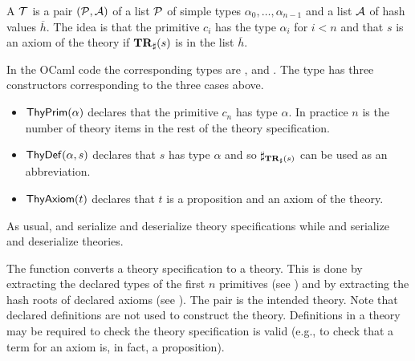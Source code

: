 A {} $\mathcal{T}$ is a pair $(\mathcal{P},\mathcal{A})$
of a list $\mathcal{P}$ of simple types $\alpha_0,\ldots,\alpha_{n-1}$
and a list $\mathcal{A}$ of hash values $\overline{h}$.
The idea is that the primitive $c_i$ has the type $\alpha_i$ for $i<n$
and that $s$ is an axiom of the theory if $\mathbf{TR}_{\sharp}(s)$ is in the list $\overline{h}$.

In the OCaml code the corresponding types are
{}, {} and
{}.
The type {} has three constructors corresponding to the three cases above.
\begin{itemize}
\item $\mbox{\constr{ThyPrim}}(\alpha)$ declares that the primitive $c_n$ has type $\alpha$.
In practice $n$ is the number of {} theory items in the rest of the
theory specification.
\item $\mbox{\constr{ThyDef}}(\alpha,s)$ declares that $s$ has type $\alpha$ and so $\mathbf{\sharp}_{\mathbf{TR}_{\sharp}(s)}$ can
be used as an abbreviation.
\item $\mbox{\constr{ThyAxiom}}(t)$ declares that $t$ is a proposition and an axiom of the theory.
\end{itemize}
As usual, 
{} and {} serialize and deserialize theory specifications
while
{} and {} serialize and deserialize theories.


The function {} converts a theory specification to a theory.
This is done by extracting the declared types of the first $n$ primitives (see {})
and by extracting the hash roots of declared axioms (see {}).
The pair is the intended theory. Note that declared definitions are not used to construct the theory.
Definitions in a theory may be required to check the theory specification is valid (e.g.,
to check that a term for an axiom is, in fact, a proposition).

